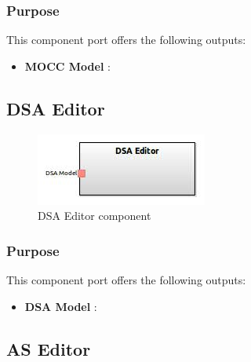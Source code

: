 \documentclass{gemoc} %
\begin{document}
\subsubsection{Purpose}


This component port offers the following outputs:
\begin{itemize}
  \item \textbf{MOCC Model} :
\end{itemize}

\subsection{DSA Editor}

\begin{figure}[htp]
	\begin{center}
	\includegraphics*[trim=0.0cm 0.0cm 0cm 0.0cm, clip=true, scale=1.0]{../images/generated/Generated_DSA Editor.jpg}
	\caption{DSA Editor component}
	\end{center}
\end{figure}

\subsubsection{Purpose}


This component port offers the following outputs:
\begin{itemize}
  \item \textbf{DSA Model} :
\end{itemize}

\subsection{AS Editor}
\end{document}
